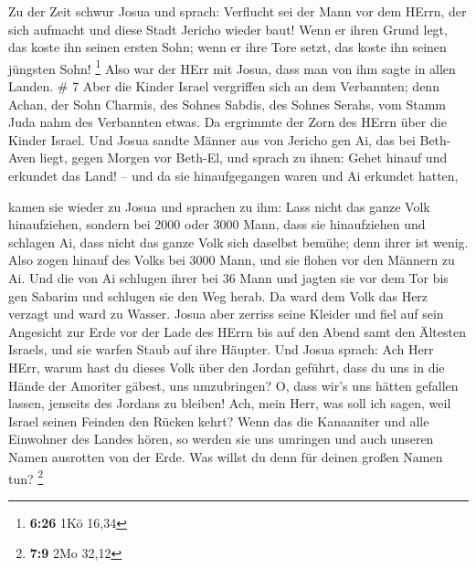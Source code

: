  Zu der Zeit schwur Josua und sprach: Verflucht sei der
Mann vor dem HErrn, der sich aufmacht und diese Stadt Jericho wieder
baut! Wenn er ihren Grund legt, das koste ihn seinen ersten Sohn; wenn
er ihre Tore setzt, das koste ihn seinen jüngsten Sohn! \footnote{\textbf{6:26}
  1Kö 16,34}  Also war der HErr mit Josua, dass man von ihm
sagte in allen Landen. \# 7  Aber die Kinder Israel
vergriffen sich an dem Verbannten; denn Achan, der Sohn Charmis, des
Sohnes Sabdis, des Sohnes Serahs, vom Stamm Juda nahm des Verbannten
etwas. Da ergrimmte der Zorn des HErrn über die Kinder Israel.
 Und Josua sandte Männer aus von Jericho gen Ai, das bei
Beth-Aven liegt, gegen Morgen vor Beth-El, und sprach zu ihnen: Gehet
hinauf und erkundet das Land! -- und da sie hinaufgegangen waren und Ai
erkundet hatten,

 kamen sie wieder zu Josua und sprachen zu ihm: Lass nicht
das ganze Volk hinaufziehen, sondern bei 2000 oder 3000 Mann, dass sie
hinaufziehen und schlagen Ai, dass nicht das ganze Volk sich daselbst
bemühe; denn ihrer ist wenig.  Also zogen hinauf des Volks
bei 3000 Mann, und sie flohen vor den Männern zu Ai.  Und
die von Ai schlugen ihrer bei 36 Mann und jagten sie vor dem Tor bis gen
Sabarim und schlugen sie den Weg herab. Da ward dem Volk das Herz
verzagt und ward zu Wasser.  Josua aber zerriss seine
Kleider und fiel auf sein Angesicht zur Erde vor der Lade des HErrn bis
auf den Abend samt den Ältesten Israels, und sie warfen Staub auf ihre
Häupter.  Und Josua sprach: Ach Herr HErr, warum hast du
dieses Volk über den Jordan geführt, dass du uns in die Hände der
Amoriter gäbest, uns umzubringen? O, dass wir's uns hätten gefallen
lassen, jenseits des Jordans zu bleiben!  Ach, mein Herr,
was soll ich sagen, weil Israel seinen Feinden den Rücken kehrt?
 Wenn das die Kanaaniter und alle Einwohner des Landes
hören, so werden sie uns umringen und auch unseren Namen ausrotten von
der Erde. Was willst du denn für deinen großen Namen tun? \footnote{\textbf{7:9}
  2Mo 32,12}


